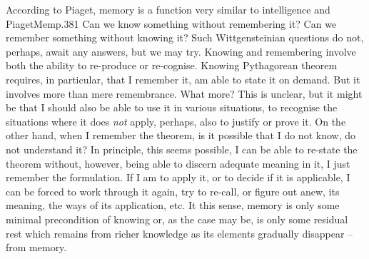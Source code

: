 \pa\label{pa:memovirt} According to Piaget, memory is a function very similar to
intelligence and \citet{the development of memory with age is the history of
  gradual organisations closely dependent on the structuring activities of
  intelligence.}{PiagetMem}{p.381 } Can we know
something without remembering it? Can we remember something without knowing
it? Such Wittgensteinian questions
do not, perhaps, await any answers, but we may try. Knowing and remembering
involve both the ability to re-produce or re-cognise. Knowing Pythagorean
theorem requires, in particular, that I remember it, am able to state it on
demand. But it involves more than mere remembrance. What more? This is unclear,
but it might be that I should also be able to use it in various situations, to
recognise the situations where it does {\em not} apply, perhaps, also to justify
or prove it.  On the other hand, when I remember the theorem, is it possible
that I do not know, do not understand it? In principle, this seems possible, I
can be able to re-state the theorem without, however, being able to discern
adequate meaning in it, I just remember the formulation. If I am to apply it, or
to decide if it is applicable, I can be forced to work through it again, try to
re-call, or figure out anew, its meaning, the ways of its application, etc.
It this sense, memory is only some minimal precondition of knowing or, as
the case may be, is only some residual rest which remains from richer knowledge
as its elements gradually disappear -- from memory.

